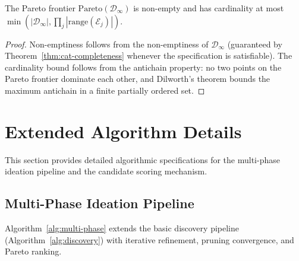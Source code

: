 \documentclass[11pt]{article}
\begin{document}
\begin{theorem}\label{thm:pareto-finite}
The Pareto frontier $\text{Pareto}(\mathcal{D}_\infty)$ is
non-empty and has cardinality at most
$\min(|\mathcal{D}_\infty|, \prod_j |\mathrm{range}(\mathcal{E}_j)|)$.
\end{theorem}

\begin{proof}
Non-emptiness follows from the non-emptiness of
$\mathcal{D}_\infty$ (guaranteed by Theorem~\ref{thm:cat-completeness}
whenever the specification is satisfiable).  The cardinality bound
follows from the antichain property: no two points on the Pareto
frontier dominate each other, and Dilworth's theorem bounds the
maximum antichain in a finite partially ordered set.
\end{proof}

\section{Extended Algorithm Details}\label{sec:algorithms}

This section provides detailed algorithmic specifications for the
multi-phase ideation pipeline and the candidate scoring mechanism.

\subsection{Multi-Phase Ideation Pipeline}

Algorithm~\ref{alg:multi-phase} extends the basic discovery pipeline
(Algorithm~\ref{alg:discovery}) with iterative refinement, pruning
convergence, and Pareto ranking.
\end{document}
